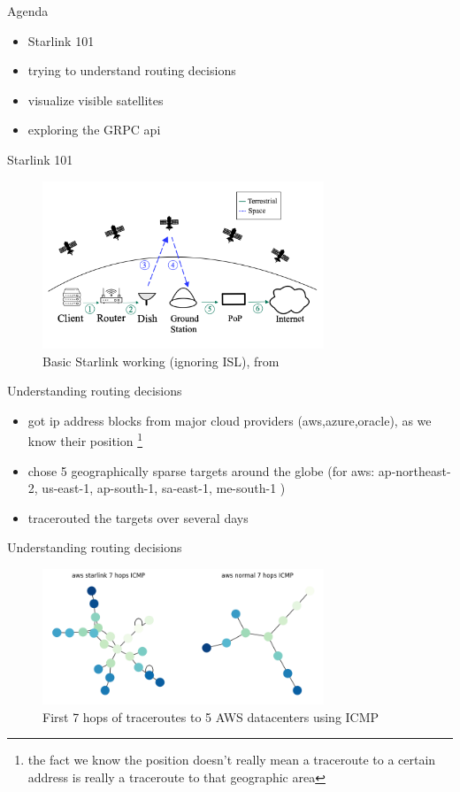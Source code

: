 \documentclass[NET,english,beameralt]{tumbeamer}
\begin{document}
\begin{frame}{Agenda}
    \begin{itemize}[<.->]
        \item Starlink 101
        \item trying to understand routing decisions
        \item visualize visible satellites
        \item exploring the GRPC api
    \end{itemize}
\end{frame}

\begin{frame}{Starlink 101}
\begin{figure}
    \includegraphics[width=0.75\textwidth]{pics/starlink-101.png}
    \caption[short]{Basic Starlink working (ignoring ISL), from \cite{izhikevich2023democratizing}}
\end{figure}
\end{frame}

\begin{frame}{Understanding routing decisions}
\begin{itemize}
    \item got ip address blocks from major cloud providers (aws,azure,oracle), as we know their position \footnote[]{the fact we know the position doesn't really mean a traceroute to a certain address is really a traceroute to that geographic area}
    \item chose 5 geographically sparse targets around the globe (for aws: ap-northeast-2, us-east-1, ap-south-1, sa-east-1, me-south-1 )
    \item tracerouted the targets over several days 
\end{itemize}
\end{frame}

\begin{frame}{Understanding routing decisions}
\begin{figure}
    \includegraphics[width=0.75\textwidth]{pics/aws_7_icmp.png}
    \caption[short]{First 7 hops of traceroutes to 5 AWS datacenters using ICMP}
\end{figure}
\end{frame}
\end{document}
